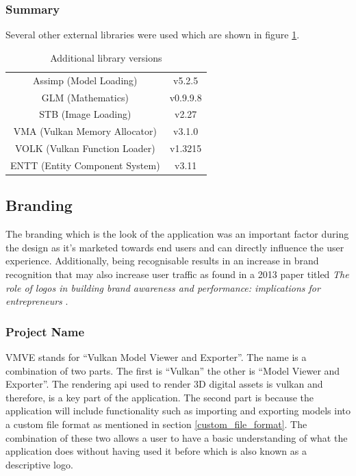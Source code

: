 \documentclass[11pt]{article}
\begin{document}
\subsubsection{Summary}
Several other external libraries were used which are shown in figure
\ref{tab:library_versions}. 

\begin{table}[H]
  \begin{center}
    \begin{tabular}{cc}
      
      \rowcolor{gray!50}
      Assimp (Model Loading) &  v5.2.5\\
      GLM (Mathematics) &  v0.9.9.8\\
      STB (Image Loading) &  v2.27 \\
      VMA (Vulkan Memory Allocator) &  v3.1.0 \\
      VOLK (Vulkan Function Loader) & v1.3215 \\
      ENTT (Entity Component System) & v3.11 \\
    \end{tabular}
  \end{center}
  \caption{Additional library versions}
  \label{tab:library_versions}
\end{table}

\subsection{Branding}
The branding which is the look of the application was an important factor during
the design as it's marketed towards end users and can directly influence the
user experience. Additionally, being recognisable results in an increase in
brand recognition that may also increase user traffic as found in a 2013 paper
titled \textit{The role of logos in building brand awareness and performance:
implications for entrepreneurs} \cite{girard2013role}.

\subsubsection{Project Name}
VMVE stands for ``Vulkan Model Viewer and Exporter''. The name is a combination
of two parts. The first is ``Vulkan'' the other is ``Model Viewer and
Exporter''. The rendering \gls*{api} used to render 3D digital assets is
\gls*{vulkan} and therefore, is a key part of the application. The second part
is because the application will include functionality such as importing and
exporting models into a custom file format as mentioned in section
\ref{custom_file_format}. The combination of these two allows a user to have a
basic understanding of what the application does without having used it before
which is also known as a descriptive logo.
\end{document}
